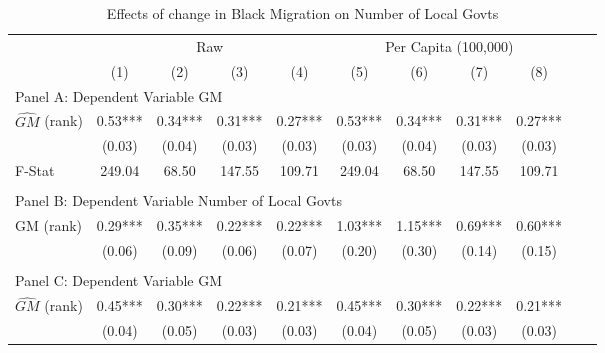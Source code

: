  \begin{table}[htbp]\centering {} \begin{threeparttable} \caption{Effects of change in Black Migration on Number of Local Govts} \begin{tabular}{l*{10}{c}} \toprule
                &\multicolumn{4}{c}{Raw}                                    &\multicolumn{4}{c}{Per Capita (100,000)}                   \\\cmidrule(lr){2-5}\cmidrule(lr){6-9}
                &\multicolumn{1}{c}{(1)}   &\multicolumn{1}{c}{(2)}   &\multicolumn{1}{c}{(3)}   &\multicolumn{1}{c}{(4)}   &\multicolumn{1}{c}{(5)}   &\multicolumn{1}{c}{(6)}   &\multicolumn{1}{c}{(7)}   &\multicolumn{1}{c}{(8)}   \\
\cmidrule(lr){1-9}
\multicolumn{8}{l}{Panel A: Dependent Variable GM}\\
\cmidrule(lr){1-9}
$\hat{GM}$ (rank)&       0.53***&       0.34***&       0.31***&       0.27***&       0.53***&       0.34***&       0.31***&       0.27***\\
                &     (0.03)   &     (0.04)   &     (0.03)   &     (0.03)   &     (0.03)   &     (0.04)   &     (0.03)   &     (0.03)   \\
\midrule
F-Stat          &     249.04   &      68.50   &     147.55   &     109.71   &     249.04   &      68.50   &     147.55   &     109.71   \\
\cmidrule[\heavyrulewidth](lr){1-9} \\ \cmidrule[\heavyrulewidth](lr){1-9}
\multicolumn{8}{l}{Panel B: Dependent Variable Number of Local Govts}\\
\cmidrule(lr){1-9}
GM  (rank)      &       0.29***&       0.35***&       0.22***&       0.22***&       1.03***&       1.15***&       0.69***&       0.60***\\
                &     (0.06)   &     (0.09)   &     (0.06)   &     (0.07)   &     (0.20)   &     (0.30)   &     (0.14)   &     (0.15)   \\
\cmidrule[\heavyrulewidth](lr){1-9} \\ \cmidrule[\heavyrulewidth](lr){1-9}
\multicolumn{8}{l}{Panel C: Dependent Variable GM}\\
\cmidrule(lr){1-9}
$\hat{GM}$ (rank)&       0.45***&       0.30***&       0.22***&       0.21***&       0.45***&       0.30***&       0.22***&       0.21***\\
                &     (0.04)   &     (0.05)   &     (0.03)   &     (0.03)   &     (0.04)   &     (0.05)   &     (0.03)   &     (0.03)   \\

\end{tabular}
\end{threeparttable}
\end{table}
